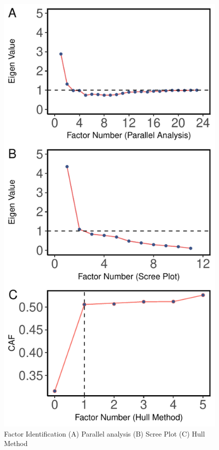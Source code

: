 \documentclass[
  english,
  man]{apa6}
\begin{document}
\begin{figure}

{\centering \includegraphics[width=1\linewidth,height=1\textheight]{Figures/600/factors} 

}

\caption{Factor Identification (A) Parallel analysis (B) Scree Plot (C) Hull Method}\label{fig:facIdFig}
\end{figure}
\end{document}
